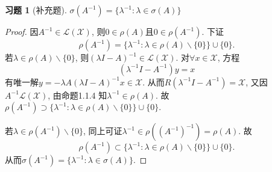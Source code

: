 \documentclass[UTF8,twoside]{ctexbook}
\newtheorem{exercise}{习题}[section]
\newcommand{\h}{\mathscr}
\numberwithin{equation}{section}
\begin{document}
	\begin{exercise}[补充题]
		$\sigma(A^{-1})=\{\lambda^{-1}:\lambda\in\sigma(A)\}$
	\end{exercise}
	\begin{proof}
		因$A^{-1}\in\h L(\h X)$, 则$0\in\rho(A)$且$0\in\rho(A^{-1})$. 下证
		\[
		\rho(A^{-1})=\{\lambda^{-1}:\lambda\in\rho(A)\backslash\{0\}\}\cup\{0\}.
		\]
		若$\lambda\in\rho(A)\backslash\{0\}$, 则$(\lambda I-A)^{-1}\in\h L(\h X)$. 对$\forall x\in\h X$, 方程
		\[
		(\lambda^{-1}I-A^{-1})y=x
		\]
		有唯一解$y=-\lambda A(\lambda I-A)^{-1}x\in\h X$. 从而$R(\lambda^{-1}I-A^{-1})=\h X$, 又因$A^{-1}\h L(\h X)$, 由命题1.1.4 知$\lambda^{-1}\in\rho(A)$. 故$\rho(A^{-1})\supset\{\lambda^{-1}:\lambda\in\rho(A)\backslash\{0\}\}\cup\{0\}$.

		若$\lambda\in\rho(A^{-1})\backslash\{0\}$, 同上可证$\lambda^{-1}\in\rho((A^{-1})^{-1})=\rho(A)$. 故\[\rho(A^{-1})\subset\{\lambda^{-1}:\lambda\in\rho(A)\backslash\{0\}\}\cup\{0\}.\]
		从而$\sigma(A^{-1})=\{\lambda^{-1}:\lambda\in\sigma(A)\}$.
	\end{proof}
\end{document}
